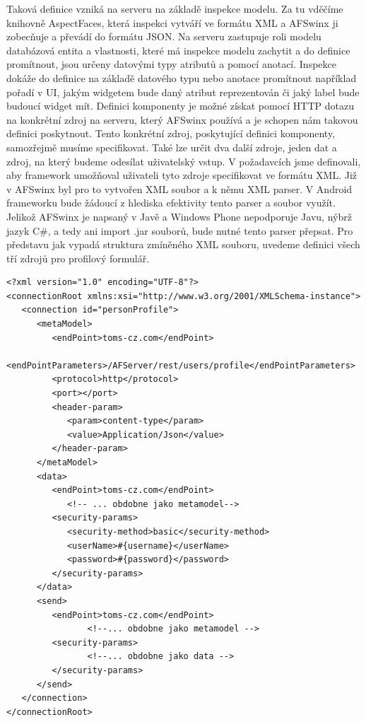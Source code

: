 Taková definice vzniká na serveru na základě inspekce modelu. Za tu vděčíme knihovně AspectFaces, která inspekci vytváří ve formátu XML a AFSwinx ji zobecňuje a převádí do formátu JSON. Na serveru zastupuje roli modelu databázová entita a vlastnosti, které má inspekce modelu zachytit a do definice promítnout, jsou určeny datovými typy atributů a pomocí anotací. Inspekce dokáže do definice na základě datového typu nebo anotace promítnout například pořadí v UI, jakým widgetem bude daný atribut reprezentován či jaký label bude budoucí widget mít.
Definici komponenty je možné získat pomocí HTTP dotazu na konkrétní zdroj na serveru, který AFSwinx používá a je schopen nám takovou definici poskytnout. Tento konkrétní zdroj, poskytující definici komponenty, samozřejmě musíme specifikovat. Také lze určit dva další zdroje, jeden dat a zdroj, na který budeme odesílat uživatelský vstup. V požadavcích jsme definovali, aby framework umožňoval uživateli tyto zdroje specifikovat ve formátu XML. Již v AFSwinx byl pro to vytvořen XML soubor a k němu XML parser. V Android frameworku bude žádoucí z hlediska efektivity tento parser a soubor využít. Jelikož AFSwinx je napsaný v Javě a Windows Phone nepodporuje Javu, nýbrž jazyk C\#, a tedy ani import .jar souborů, bude nutné tento parser přepsat. Pro představu jak vypadá struktura zmíněného XML souboru, uvedeme definici všech tří zdrojů pro profilový formulář.
\begin{lstlisting}[caption=Ukázka XML specifikace zdrojů,
label={code:xmlSource}, basicstyle=\footnotesize]
<?xml version="1.0" encoding="UTF-8"?>
<connectionRoot xmlns:xsi="http://www.w3.org/2001/XMLSchema-instance">
   <connection id="personProfile">
      <metaModel>
         <endPoint>toms-cz.com</endPoint>
         <endPointParameters>/AFServer/rest/users/profile</endPointParameters>
         <protocol>http</protocol>
         <port></port>
         <header-param>
            <param>content-type</param>
            <value>Application/Json</value>
         </header-param>
      </metaModel>
      <data>
         <endPoint>toms-cz.com</endPoint>
         	<!-- ... obdobne jako metamodel-->
         <security-params>
            <security-method>basic</security-method>
            <userName>#{username}</userName>
            <password>#{password}</password>
         </security-params>
      </data>
      <send>
         <endPoint>toms-cz.com</endPoint>
            	<!--... obdobne jako metamodel -->
         <security-params>
                <!--... obdobne jako data -->
         </security-params>
      </send>
   </connection>
</connectionRoot>
\end{lstlisting}

